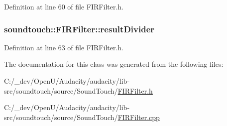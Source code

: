 Definition at line 60 of file F\+I\+R\+Filter.\+h.

\subsubsection[{\texorpdfstring{result\+Divider}{resultDivider}}]{ soundtouch\+::\+F\+I\+R\+Filter\+::result\+Divider\hspace{0.3cm}{\ttfamily [protected]}}\hypertarget{classsoundtouch_1_1_f_i_r_filter_a8b963c3014ad852faa4e28c10757b444}{}\label{classsoundtouch_1_1_f_i_r_filter_a8b963c3014ad852faa4e28c10757b444}


Definition at line 63 of file F\+I\+R\+Filter.\+h.



The documentation for this class was generated from the following files\+:\begin{DoxyCompactItemize}
\item 
C\+:/\+\_\+dev/\+Open\+U/\+Audacity/audacity/lib-\/src/soundtouch/source/\+Sound\+Touch/\hyperlink{_f_i_r_filter_8h}{F\+I\+R\+Filter.\+h}\item 
C\+:/\+\_\+dev/\+Open\+U/\+Audacity/audacity/lib-\/src/soundtouch/source/\+Sound\+Touch/\hyperlink{_f_i_r_filter_8cpp}{F\+I\+R\+Filter.\+cpp}\end{DoxyCompactItemize}

